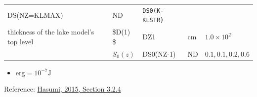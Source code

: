 \begin{longtable}[]{@{}lllll@{}}
\begin{minipage}[t]{0.08\columnwidth}
DS(NZ=KLMAX)\strut
\end{minipage} & \begin{minipage}[t]{0.12\columnwidth}\raggedright
\(\mathrm{ND}\)\strut
\end{minipage} & \begin{minipage}[t]{0.17\columnwidth}\raggedright
\texttt{DS0(K-KLSTR)}\strut
\end{minipage}\tabularnewline
\begin{minipage}[t]{0.31\columnwidth}\raggedright
thickness of the lake model's top level\strut
\end{minipage} & \begin{minipage}[t]{0.19\columnwidth}\raggedright
\$D(1) \$\strut
\end{minipage} & \begin{minipage}[t]{0.08\columnwidth}\raggedright
DZ1\strut
\end{minipage} & \begin{minipage}[t]{0.12\columnwidth}\raggedright
\(\mathrm{cm}\)\strut
\end{minipage} & \begin{minipage}[t]{0.17\columnwidth}\raggedright
\(1.0\times 10^2\)\strut
\end{minipage}\tabularnewline
\begin{minipage}[t]{0.31\columnwidth}\raggedright
\strut
\end{minipage} & \begin{minipage}[t]{0.19\columnwidth}\raggedright
\(S_0(z)\)\strut
\end{minipage} & \begin{minipage}[t]{0.08\columnwidth}\raggedright
DS0(NZ-1)\strut
\end{minipage} & \begin{minipage}[t]{0.12\columnwidth}\raggedright
\(\mathrm{ND}\)\strut
\end{minipage} & \begin{minipage}[t]{0.17\columnwidth}\raggedright
\(0.1, 0.1, 0.2, 0.6\)\strut
\end{minipage}\tabularnewline
\bottomrule
\end{longtable}

\begin{itemize}
\tightlist
\item
  \(\mathrm{erg}=10^{-7} \mathrm{J}\)
\end{itemize}

Reference:
\href{https://ccsr.aori.u-tokyo.ac.jp/~hasumi/COCO/coco4.pdf}{Hasumi,
2015, Section 3.2.4}

